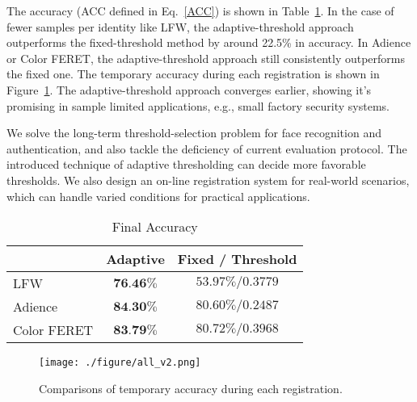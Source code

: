 \documentclass[10pt,twocolumn]{article}
\begin{document}
The accuracy (ACC defined in Eq.~\ref{ACC}) is shown in Table~\ref{tab:experiment-result}.
In the case of fewer samples per identity like LFW, the adaptive-threshold approach outperforms the fixed-threshold method by around 22.5\% in accuracy. In Adience or Color FERET, the adaptive-threshold approach still consistently outperforms the fixed one.
The temporary accuracy during each registration is shown in Figure~\ref{fig:result}. The adaptive-threshold approach converges earlier, showing it's promising in sample limited applications, e.g., small factory security systems. 


We solve the long-term threshold-selection problem for face recognition and authentication, and also tackle the deficiency of current evaluation protocol. The introduced technique of adaptive thresholding can decide more favorable thresholds. We also design an on-line registration system for real-world scenarios, which can handle varied conditions for practical applications.


\begin{table}[t]
\centering
\caption{Final Accuracy}
\label{tab:experiment-result}
\begin{tabular}{lcc}
\toprule
            &  Adaptive & Fixed / Threshold \\ \midrule
LFW         & $\textbf{76.46}\% $ & $53.97\%/0.3779$\\
Adience     & $\textbf{84.30}\% $ & $80.60\% /0.2487 $\\
Color FERET & $\textbf{83.79}\% $ & $80.72\%/0.3968$\\ \midrule
\end{tabular}
\end{table}




\begin{figure}[t]
\centering
\vspace{-10pt}
\texttt{[image: ./figure/all\_v2.png]}
\caption{Comparisons of temporary accuracy during each registration.}
\label{fig:result}
\end{figure}


\nocite{}


\end{document}
